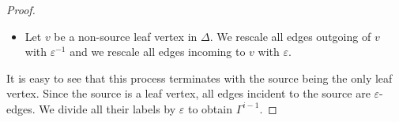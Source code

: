 \begin{proof}
\begin{itemize}
\item Let $v$ be a non-source leaf vertex in $\Delta$. We rescale all edges outgoing of $v$ with $\varepsilon^{-1}$ and we rescale all edges incoming to $v$ with $\varepsilon$.
\end{itemize}
It is easy to see that this process terminates with the source being the only leaf vertex. Since the source is a leaf vertex, all edges incident to the source are $\varepsilon$-edges. We divide all their labels by $\varepsilon$ to obtain $\Gamma^{i-1}$.
\end{proof}
